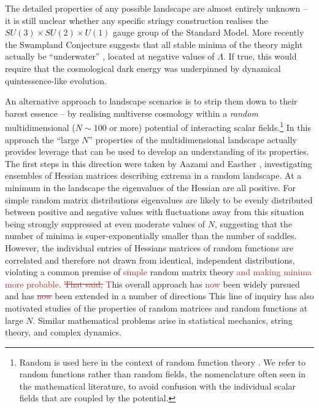 \documentclass[12pt]{article}
\newcommand{\sh}[1]{\textcolor{brown}{#1}}
\begin{document}
The detailed properties of any possible landscape are almost entirely unknown -- it is still unclear whether any specific stringy construction  realises  the $SU(3) \times SU(2) \times U(1)$ gauge group of the Standard Model.  More recently the Swampland Conjecture suggests that all stable minima of the theory might actually be ``underwater'' \cite{Agrawal2018},  located at negative values of $\Lambda$. If true, this would require that the cosmological dark energy was underpinned by dynamical quintessence-like evolution.  

An alternative approach to   landscape scenarios is to strip them down to their barest essence -- by realising multiverse cosmology within a {\em random\/} multidimensional ($N\sim100$ or more) potential of interacting scalar fields.\footnote{Random is used here in the  context of random function theory \cite{GRF1, GRF2, GRF3}.  We refer to random functions rather than random fields, the nomenclature often seen in the mathematical literature, to avoid confusion with the individual scalar fields that are coupled by the potential.}  In this approach the ``large $N$'' properties of the multidimensional landscape actually provides leverage that can be used to develop an understanding of its properties. The first steps in this direction were taken by Aazami and Easther \cite{Aazami2006}, investigating ensembles of Hessian matrices describing extrema in a random landscape. At  a minimum in the landscape the eigenvalues of the Hessian are all positive. For simple random matrix distributions eigenvalues are likely to be evenly distributed between positive and negative values with fluctuations away from this situation being strongly suppressed at even moderate values of $N$, suggesting that the number of minima is super-exponentially smaller than the number of saddles. However, the individual entries of Hessians matrices of random functions are correlated and therefore not drawn from identical, independent distributions,\cite{Battefeld2012,Easther2016} violating a common premise of \sh{simple} random matrix theory \sh{and making minima more probable}. \sh{\sout{That said,} T}his overall approach has \sh{now} been widely pursued and has \sh{\sout{now}} been extended in a number of directions \cite{Easther2006, Frazer2011, Henry2009, Marsh2013, Agarwal2011,Yang2012,Masoumi2016,Yamada2018} This line of inquiry has also motivated studies of the properties of random matrices and random functions at large $N$.\cite{Bray2007,Dean2008,Majumdar2009,Bachlechner2014,Battefeld2012,Fyodorov2013,Masoumi2017} Similar mathematical problems arise in statistical mechanics, string theory, and complex dynamics.\cite{Fyodorov2004,Douglas2004,Douglas2006,Fyodorov2007,Fyodorov2012,Fyodorov2018,Ros2019}
\end{document}
